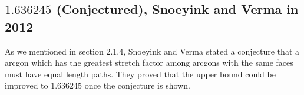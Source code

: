 \subsection{\texorpdfstring{$1.636245$}{Lg} (Conjectured), Snoeyink and Verma in 2012}
As we mentioned in section 2.1.4, Snoeyink and Verma stated a conjecture that  a arcgon which has the greatest stretch factor among arcgons with the same faces must have equal length paths. They proved that the upper bound could be improved to $1.636245$ once the conjecture is shown.